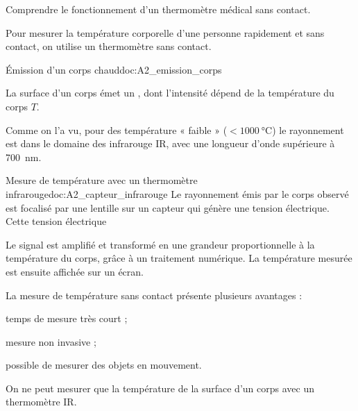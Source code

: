 \tetePremStssLumi

\vspace*{-32pt}


\begin{objectifs}
  \item Comprendre le fonctionnement d'un thermomètre médical sans contact.
\end{objectifs}

\begin{contexte}
  Pour mesurer la température corporelle d'une personne rapidement et sans contact, on utilise un thermomètre sans contact.
  
\end{contexte}


\begin{doc}{Émission d'un corps chaud}{doc:A2_emission_corps}
  \begin{importants}
    La surface d'un corps émet un , dont l'intensité dépend de la température du corps $T$.
  \end{importants}

  Comme on l'a vu, pour des température « faible » ($< \qty{1000}{\degreeCelsius}$) le rayonnement est dans le domaine des infrarouge IR, avec une longueur d'onde supérieure à \qty{700}{\nm}.
\end{doc}

\begin{doc}{Mesure de température avec un thermomètre infrarouge}{doc:A2_capteur_infrarouge}
  Le rayonnement émis par le corps observé est focalisé par une lentille sur un capteur qui génère une tension électrique.
  Cette tension électrique 
  
  Le signal est amplifié et transformé en une grandeur proportionnelle à la température du corps, grâce à un traitement numérique.
  La température mesurée est ensuite affichée sur un écran.

  La mesure de température sans contact présente plusieurs avantages :
  \begin{listePoints}
    \item temps de mesure très court ;
    \item mesure non invasive ;
    \item possible de mesurer des objets en mouvement.
  \end{listePoints}

  \begin{center}
  \end{center}

  On ne peut mesurer que la température de la surface d'un corps avec un thermomètre IR.
\end{doc}


